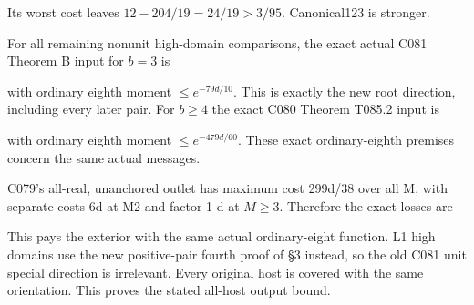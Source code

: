 Its worst cost leaves \(12-204/19=24/19>3/95\). Canonical123 is stronger.

For all remaining nonunit high-domain comparisons, the exact actual C081 Theorem B input for \(b=3\) is



with ordinary eighth moment \(\le e^{-79d/10}\). This is exactly the new root direction, including every later pair. For \(b\ge 4\) the exact C080 Theorem T085.2 input is



with ordinary eighth moment \(\le e^{-479d/60}\).  These exact ordinary-eighth premises concern the same actual messages.

C079's all-real, unanchored outlet has maximum cost 299d/38 over all M, with separate costs 6d at M2 and factor 1-d at \(M\ge 3.\) Therefore the exact losses are



This pays the exterior with the same actual ordinary-eight function.  L1 high domains use the new positive-pair fourth proof of §3 instead, so the old C081 unit special direction is irrelevant. Every original host is covered with the same orientation. This proves the stated all-host output bound.
